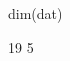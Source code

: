 \begin{Schunk}
\begin{Sinput}
  dim(dat)
\end{Sinput}
\begin{Soutput}
[1] 19  5
\end{Soutput}
\end{Schunk}

